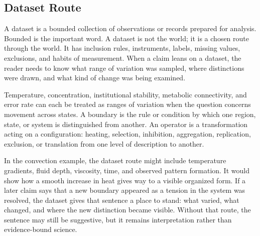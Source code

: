 \documentclass[11pt,a4paper,openany]{book}
\begin{document}
\subsection{Dataset Route}
A dataset is a bounded collection of observations or records prepared for analysis. Bounded is the important word. A dataset is not the world; it is a chosen route through the world. It has inclusion rules, instruments, labels, missing values, exclusions, and habits of measurement. When a claim leans on a dataset, the reader needs to know what range of variation was sampled, where distinctions were drawn, and what kind of change was being examined. \cite{haken_synergetics,nicolis_prigogine_selforg}\par
Temperature, concentration, institutional stability, metabolic connectivity, and error rate can each be treated as ranges of variation when the question concerns movement across states. A boundary is the rule or condition by which one region, state, or system is distinguished from another. An operator is a transformation acting on a configuration: heating, selection, inhibition, aggregation, replication, exclusion, or translation from one level of description to another.\par
In the convection example, the dataset route might include temperature gradients, fluid depth, viscosity, time, and observed pattern formation. It would show how a smooth increase in heat gives way to a visible organized form. If a later claim says that a new boundary appeared as a tension in the system was resolved, the dataset gives that sentence a place to stand: what varied, what changed, and where the new distinction became visible. Without that route, the sentence may still be suggestive, but it remains interpretation rather than evidence-bound science.\par
\end{document}
